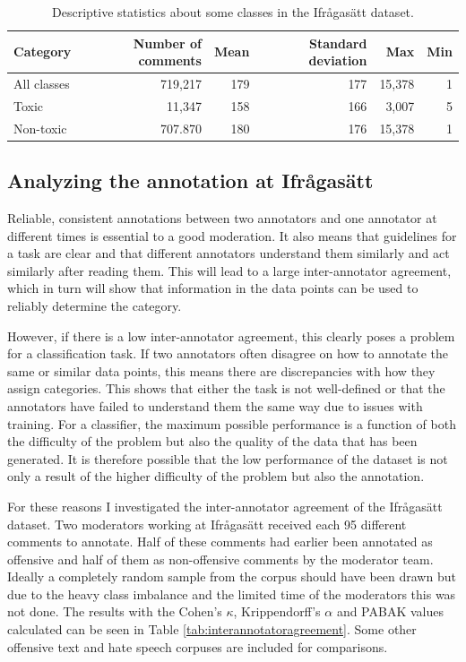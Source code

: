 \documentclass[nofilelist]{cslthse-msc}
\begin{document}
\begin{table}[t]
\centering
\begin{tabular}{@{}lrrrrr@{}}
\toprule
Category    & Number of comments & Mean & Standard deviation & Max   & Min \\ \midrule
All classes & 719,217 & 179  & 177                & 15,378 & 1   \\
Toxic       & 11,347 & 158  & 166                & 3,007  & 5   \\ 
Non-toxic   & 707.870 & 180 & 176 & 15,378 & 1 \\\bottomrule
\end{tabular}
\caption{Descriptive statistics about some classes in the Ifrågasätt dataset.}
\label{tab:deskriptiv}
\end{table}

\subsection{Analyzing the annotation at Ifrågasätt}

Reliable, consistent annotations between two annotators and one annotator at different times is essential to a good moderation. It also means that guidelines for a task are clear and that different annotators understand them similarly and act similarly after reading them. This will lead to a large inter-annotator agreement, which in turn will show that information in the data points can be used to reliably determine the category. 

However, if there is a low inter-annotator agreement, this clearly poses a problem for a classification task. If two annotators often disagree on how to annotate the same or similar data points, this means there are discrepancies with how they assign categories. This shows that either the task is not well-defined or that the annotators have failed to understand them the same way due to issues with training. For a classifier, the maximum possible performance is a function of both the difficulty of the problem but also the quality of the data that has been generated. It is therefore possible that the low performance of the dataset is not only a result of the higher difficulty of the problem but also the annotation.

For these reasons I investigated the inter-annotator agreement of the Ifrågasätt dataset. Two moderators working at Ifrågasätt received each 95 different comments to annotate. Half of these comments had earlier been annotated as offensive and half of them as non-offensive comments by the moderator team. Ideally a completely random sample from the corpus should have been drawn but due to the heavy class imbalance and the limited time of the moderators this was not done. The results with the Cohen's $\kappa$, Krippendorff's $\alpha$ and PABAK values calculated can be seen in Table \ref{tab:interannotatoragreement}. Some other offensive text and hate speech corpuses are included for comparisons.
\end{document}
